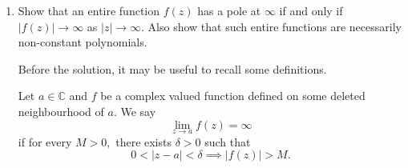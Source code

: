 \documentclass[12pt]{article}
\theoremstyle{definition}
\newenvironment{soln}{\begin{proof}[Solution]}{\end{proof}}
\begin{document}
\begin{enumerate}[leftmargin=*]
\begin{soln}
    	Fix $k \in \{1, \ldots, n\}.$ Note that $P(a_k) = 0.$ Thus, the above can be written as:
    	\begin{equation*} 
    		P(z) - P(a_k) = (z - a_1)\cdots(z - a_n).
    	\end{equation*}
    	If $z \neq a_k,$ then we may divide by $z - a_k$ to get
    	\begin{equation*} 
    		\dfrac{P(z) - P(a_k)}{z - a_k} = \prod_{j \neq k}^{}(z - a_j).
    	\end{equation*}
    	Letting $z \to a_k$ gives the answer.
    \end{soln}
    \begin{soln}
    	{\color{myupdatecolor}Here's an alternate solution.}

    	As above, we can write
    	\begin{equation*} 
    		P(z) = \prod_{j = 1}^{n}(z - a_j).
    	\end{equation*}
    	Fix some $k \in \{1, \ldots, n\}.$ Then, the above can be written as
    	\begin{equation*} 
    		P(z) = (z - a_k)P_k(z),	
    	\end{equation*}
    	where $P_k$ is defined as
    	\begin{equation*} 
    		P_k(z) \vcentcolon= \prod_{j \neq k}(z - a_j).
    	\end{equation*}
    	Note that $P_k(a_k)$ is precisely the LHS of the equation given in the question. On the other hand, using product rule, we have
    	\begin{equation*} 
    		P'(z) = (z - a_k)P_k'(z) + P_k(z).
    	\end{equation*}
    	Substituting $z = a_k$ above gives the answer.
    \end{soln}
    \item Show that an entire function $f(z)$ has a pole at $\infty$ if and only if $|f(z)| \to \infty$ as $|z| \to \infty.$ Also show that such entire functions are necessarily non-constant polynomials.

    {\color{myupdatecolor}Before the solution, it may be useful to recall some definitions.}

    \begin{defn}
    	Let $a \in \mathbb{C}$ and $f$ be a complex valued function defined on some deleted neighbourhood of $a.$ We say 
    	\begin{equation*} 
    		\lim_{z\to a}f(z) = \infty
    	\end{equation*}
    	if for every $M > 0,$ there exists $\delta > 0$ such that
    	\begin{equation*} 
    		0 < |z - a| < \delta \implies |f(z)| > M.
    	\end{equation*}
    \end{defn}


\end{enumerate}
\end{document}
